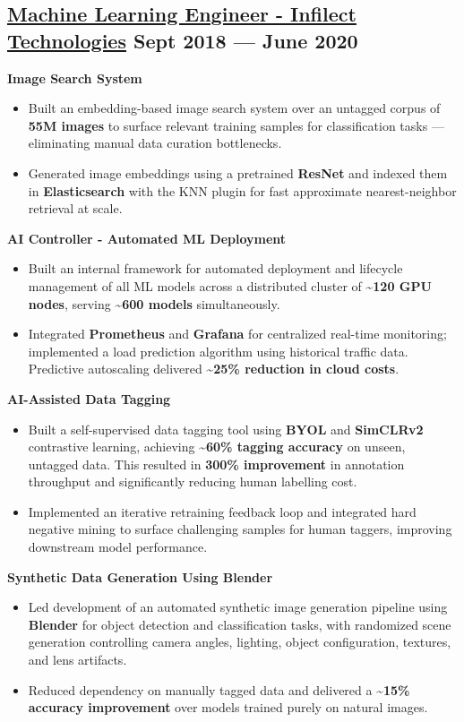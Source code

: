 \documentclass[a4,10pt]{article}
\newenvironment{zitemize}{
\begin{itemize}\itemsep0pt \parskip0pt \parsep1pt}
{\end{itemize}\vspace{-0.5cm}}
\newcommand{\hrole}[2]{{\fontsize{11}{12}\selectfont \textbf{\underline{#1}}  \hfill{#2}}}
\newcommand{\hprojectname}[1]{\vspace{0.4cm}\noindent\textbf{#1}\vspace{-0.1cm}}
\begin{document}
\subsection{\hrole{Machine Learning Engineer - Infilect Technologies}{Sept 2018 --- June 2020}}

    \hprojectname{Image Search System}
    \begin{zitemize}
        \item Built an embedding-based image search system over an untagged corpus of \textbf{55M images} to surface relevant training samples for classification tasks — eliminating manual data curation bottlenecks.
        \item Generated image embeddings using a pretrained \textbf{ResNet} and indexed them in \textbf{Elasticsearch} with the KNN plugin for fast approximate nearest-neighbor retrieval at scale.
    \end{zitemize}

    \hprojectname{AI Controller - Automated ML Deployment}
    \begin{zitemize}
        \item Built an internal framework for automated deployment and lifecycle management of all ML models across a distributed cluster of \textbf{\textasciitilde120 GPU nodes}, serving \textbf{\textasciitilde600 models} simultaneously.
        \item Integrated \textbf{Prometheus} and \textbf{Grafana} for centralized real-time monitoring; implemented a load prediction algorithm using historical traffic data. Predictive autoscaling delivered \textbf{\textasciitilde25\% reduction in cloud costs}.
    \end{zitemize}

    \hprojectname{AI-Assisted Data Tagging}
    \begin{zitemize}
        \item Built a self-supervised data tagging tool using \textbf{BYOL} and \textbf{SimCLRv2} contrastive learning, achieving \textbf{\textasciitilde60\% tagging accuracy} on unseen, untagged data. This resulted in \textbf{300\% improvement} in annotation throughput and significantly reducing human labelling cost.
        \item Implemented an iterative retraining feedback loop and integrated hard negative mining to surface challenging samples for human taggers, improving downstream model performance.
    \end{zitemize}

    \hprojectname{Synthetic Data Generation Using Blender}
    \begin{zitemize}
        \item Led development of an automated synthetic image generation pipeline using \textbf{Blender} for object detection and classification tasks, with randomized scene generation controlling camera angles, lighting, object configuration, textures, and lens artifacts.
        \item Reduced dependency on manually tagged data and delivered a \textbf{\textasciitilde15\% accuracy improvement} over models trained purely on natural images.
    \end{zitemize}
\end{document}
